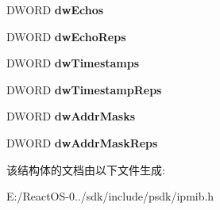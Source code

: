 \begin{DoxyCompactItemize}
D\+W\+O\+RD {\bfseries dw\+Echos}
\item 
\mbox{\label{struct___m_i_b_i_c_m_p_s_t_a_t_s_a622510a3b159999bc57c386c79691297}} 
D\+W\+O\+RD {\bfseries dw\+Echo\+Reps}
\item 
\mbox{\label{struct___m_i_b_i_c_m_p_s_t_a_t_s_a848abc05876e9f7b7b3cb3aea25ceb76}} 
D\+W\+O\+RD {\bfseries dw\+Timestamps}
\item 
\mbox{\label{struct___m_i_b_i_c_m_p_s_t_a_t_s_ac7967de5a8dcaeb24f31a69f4f31ccd4}} 
D\+W\+O\+RD {\bfseries dw\+Timestamp\+Reps}
\item 
\mbox{\label{struct___m_i_b_i_c_m_p_s_t_a_t_s_a3fad21838c41aaa0a21069b36775e461}} 
D\+W\+O\+RD {\bfseries dw\+Addr\+Masks}
\item 
\mbox{\label{struct___m_i_b_i_c_m_p_s_t_a_t_s_a64ebb026bbd309bca81624b731567a34}} 
D\+W\+O\+RD {\bfseries dw\+Addr\+Mask\+Reps}
\end{DoxyCompactItemize}


该结构体的文档由以下文件生成\+:\begin{DoxyCompactItemize}
\item 
E\+:/\+React\+O\+S-\/0../sdk/include/psdk/ipmib.\+h\end{DoxyCompactItemize}
